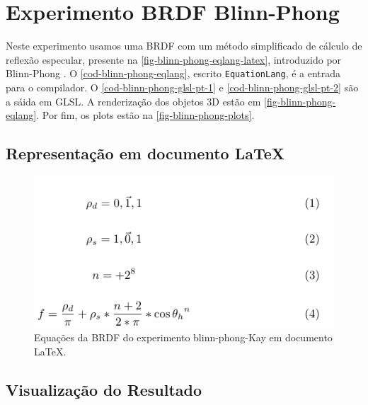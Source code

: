 \section{Experimento BRDF Blinn-Phong}

Neste experimento usamos uma BRDF com um método simplificado de cálculo de reflexão especular, presente na \autoref{fig-blinn-phong-eqlang-latex}, introduzido por Blinn-Phong \cite{blinn1977models}. O \autoref{cod-blinn-phong-eqlang}, escrito \texttt{EquationLang}, é a entrada para o compilador. O \autoref{cod-blinn-phong-glsl-pt-1} e \autoref{cod-blinn-phong-glsl-pt-2} são a sáida em GLSL. A renderização dos objetos 3D estão em \autoref{fig-blinn-phong-eqlang}. Por fim, os plots estão na \autoref{fig-blinn-phong-plots}.

\subsection{Representação em documento \LaTeX{}}
\begin{figure}[H]
    \caption{\label{fig-blinn-phong-eqlang-latex} \small Equações da BRDF do experimento blinn-phong-Kay em documento \LaTeX{}.}
    \begin{center}
        \includegraphics[scale=0.92]{./Imagens/brdfs/blinn-phong.pdf}
    \end{center}
\end{figure}

\subsection{Visualização do Resultado}

